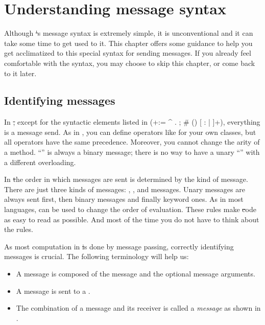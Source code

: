 \documentclass[a4paper,10pt,twoside]{book}
\begin{document}
	\renewcommand{\nnbb}[2]{} %
	\sloppy
\fi
\chapter{Understanding message syntax}
\label{cha:understanding}

Although \st's message syntax is extremely simple, it is unconventional and it can take some time to get used to it.
This chapter offers some guidance to help you get acclimatized to this special syntax for sending messages.
If you already feel comfortable with the syntax, you may choose to skip this chapter, or come back to it later.

\section{Identifying messages}

In \st, except for the syntactic elements listed in  (\ct+:= ^ . ; # () {} [ : | ]+), everything is a message send. 
As in , you can define operators like \ct{+} for your own classes, but all operators have the same precedence.
Moreover, you cannot change the arity of a method. ``\ct{-}'' is always a binary message; there is no way to have a unary ``\ct{-}'' with a different overloading.

In \st the order in which messages are sent is determined by the kind of message. There are just three kinds of messages: , , and  messages. Unary messages are always sent first, then binary messages and finally keyword ones. As in most languages,  can be used to change the order of evaluation. These rules make \st code as easy to read as possible. And most of the time you do not have to think about the rules.

As most computation in \st is done by message passing, correctly identifying messages is crucial. The following terminology will help us:

\begin{itemize}
  \item A message is composed of the message  and the optional message arguments.
  \item A message is sent to a .
  \item The combination of a message and its receiver is called a \emph{message}  as shown in .
\end{itemize}
\end{document}
